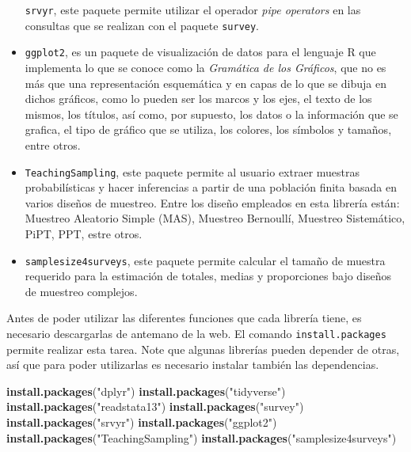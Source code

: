 \documentclass[
  spanish,
  12pt,
]{book}
\newenvironment{Shaded}{\begin{snugshade}}{\end{snugshade}}
\newcommand{\FunctionTok}[1]{\textcolor[rgb]{0.13,0.29,0.53}{\textbf{#1}}}
\newcommand{\NormalTok}[1]{#1}
\newcommand{\StringTok}[1]{\textcolor[rgb]{0.31,0.60,0.02}{#1}}
\begin{document}
\begin{itemize}
  \texttt{srvyr}, este paquete permite utilizar el operador \emph{pipe operators} en las consultas que se realizan con el paquete \texttt{survey}.
\item
  \texttt{ggplot2}, es un paquete de visualización de datos para el lenguaje R que implementa lo que se conoce como la \emph{Gramática de los Gráficos}, que no es más que una representación esquemática y en capas de lo que se dibuja en dichos gráficos, como lo pueden ser los marcos y los ejes, el texto de los mismos, los títulos, así como, por supuesto, los datos o la información que se grafica, el tipo de gráfico que se utiliza, los colores, los símbolos y tamaños, entre otros.
\item
  \texttt{TeachingSampling}, este paquete permite al usuario extraer muestras probabilísticas y hacer inferencias a partir de una población finita basada en varios diseños de muestreo. Entre los diseño empleados en esta librería están: Muestreo Aleatorio Simple (MAS), Muestreo Bernoullí, Muestreo Sistemático, PiPT, PPT, estre otros.
\item
  \texttt{samplesize4surveys}, este paquete permite calcular el tamaño de muestra requerido para la estimación de totales, medias y proporciones bajo diseños de muestreo complejos.
\end{itemize}

Antes de poder utilizar las diferentes funciones que cada librería tiene, es necesario descargarlas de antemano de la web. El comando \texttt{install.packages} permite realizar esta tarea. Note que algunas librerías pueden depender de otras, así que para poder utilizarlas es necesario instalar también las dependencias.

\begin{Shaded}
\begin{Highlighting}[]
\FunctionTok{install.packages}\NormalTok{(}\StringTok{"dplyr"}\NormalTok{)}
\FunctionTok{install.packages}\NormalTok{(}\StringTok{"tidyverse"}\NormalTok{)}
\FunctionTok{install.packages}\NormalTok{(}\StringTok{"readstata13"}\NormalTok{) }
\FunctionTok{install.packages}\NormalTok{(}\StringTok{"survey"}\NormalTok{)}
\FunctionTok{install.packages}\NormalTok{(}\StringTok{"srvyr"}\NormalTok{)}
\FunctionTok{install.packages}\NormalTok{(}\StringTok{"ggplot2"}\NormalTok{)}
\FunctionTok{install.packages}\NormalTok{(}\StringTok{"TeachingSampling"}\NormalTok{)}
\FunctionTok{install.packages}\NormalTok{(}\StringTok{"samplesize4surveys"}\NormalTok{)}
\end{Highlighting}
\end{Shaded}
\end{document}
